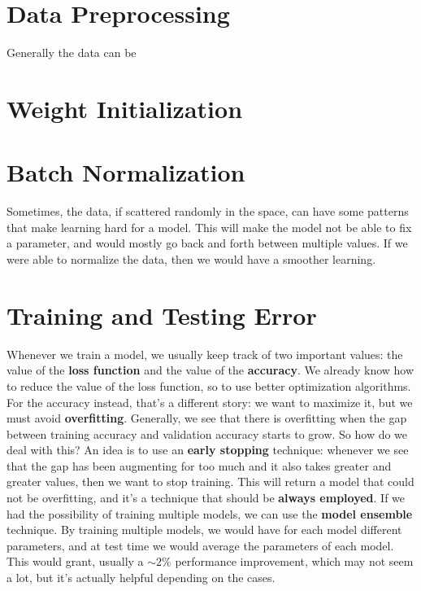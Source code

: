 \section{Data Preprocessing}

Generally the data can be

\section{Weight Initialization}

\pagebreak

\section{Batch Normalization}

Sometimes, the data, if scattered randomly in the space, can have some patterns that make learning hard for a model. This will make the model not be able to fix a parameter, and would mostly go back and forth between multiple values. If we were able to normalize the data, then we would have a smoother learning. 

\pagebreak

\section{Training and Testing Error}

Whenever we train a model, we usually keep track of two important values: the value of the \textbf{loss function} and the value of the \textbf{accuracy}. We already know how to reduce the value of the loss function, so to use better optimization algorithms. For the accuracy instead, that's a different story: we want to maximize it, but we must avoid \textbf{overfitting}. Generally, we see that there is overfitting when the gap between training accuracy and validation accuracy starts to grow.
\nl
So how do we deal with this? An idea is to use an \textbf{early stopping} technique: whenever we see that the gap has been augmenting for too much and it also takes greater and greater values, then we want to stop training. This will return a model that could not be overfitting, and it's a technique that should be \textbf{always employed}.
\nl
If we had the possibility of training multiple models, we can use the \textbf{model ensemble} technique. By training multiple models, we would have for each model different parameters, and at test time we would average the parameters of each model. This would grant, usually a $\sim 2\%$ performance improvement, which may not seem a lot, but it's actually helpful depending on the cases.

